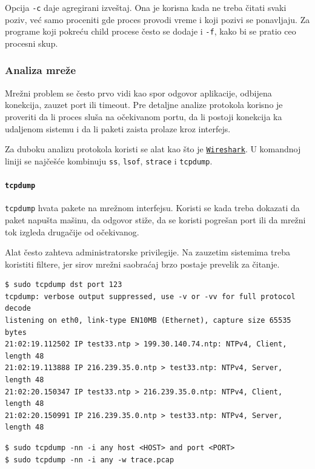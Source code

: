 Opcija \texttt{-c} daje agregirani izveštaj. Ona je korisna kada ne treba čitati svaki poziv, već samo proceniti gde proces provodi vreme i koji pozivi se ponavljaju. Za programe koji pokreću child procese često se dodaje i \texttt{-f}, kako bi se pratio ceo procesni skup.

\subsubsection{Analiza mreže}\label{analiza-mreux17ee}

Mrežni problem se često prvo vidi kao spor odgovor aplikacije, odbijena konekcija, zauzet port ili timeout. Pre detaljne analize protokola korisno je proveriti da li proces sluša na očekivanom portu, da li postoji konekcija ka udaljenom sistemu i da li paketi zaista prolaze kroz interfejs.

Za duboku analizu protokola koristi se alat kao što je \href{https://www.wireshark.org/}{\texttt{Wireshark}}. U komandnoj liniji se najčešće kombinuju \texttt{ss}, \texttt{lsof}, \texttt{strace} i \texttt{tcpdump}.

\paragraph{\texorpdfstring{\texttt{tcpdump}}{tcpdump}}\label{tcpdump}

\texttt{tcpdump} hvata pakete na mrežnom interfejsu. Koristi se kada treba dokazati da paket napušta mašinu, da odgovor stiže, da se koristi pogrešan port ili da mrežni tok izgleda drugačije od očekivanog.

Alat često zahteva administratorske privilegije. Na zauzetim sistemima treba koristiti filtere, jer sirov mrežni saobraćaj brzo postaje prevelik za čitanje.

\begin{verbatim}
$ sudo tcpdump dst port 123
tcpdump: verbose output suppressed, use -v or -vv for full protocol decode
listening on eth0, link-type EN10MB (Ethernet), capture size 65535 bytes
21:02:19.112502 IP test33.ntp > 199.30.140.74.ntp: NTPv4, Client, length 48
21:02:19.113888 IP 216.239.35.0.ntp > test33.ntp: NTPv4, Server, length 48
21:02:20.150347 IP test33.ntp > 216.239.35.0.ntp: NTPv4, Client, length 48
21:02:20.150991 IP 216.239.35.0.ntp > test33.ntp: NTPv4, Server, length 48
\end{verbatim}

\begin{verbatim}
$ sudo tcpdump -nn -i any host <HOST> and port <PORT>
$ sudo tcpdump -nn -i any -w trace.pcap
\end{verbatim}

